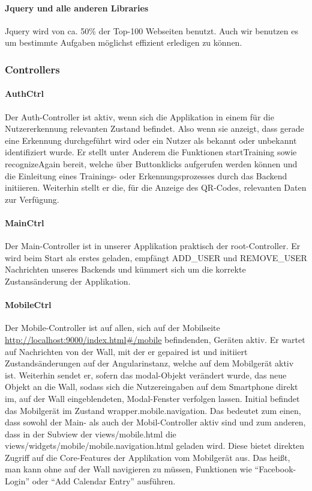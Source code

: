 \documentclass[10pt,a4paper]{report}
\newcommand{\code}[1]{{\fontfamily{cmvtt}\selectfont #1}}
\begin{document}
				\paragraph{Jquery und alle anderen Libraries}
					Jquery wird von ca. 50\% der Top-100 Webseiten benutzt. Auch wir benutzen es um bestimmte Aufgaben möglichst effizient erledigen zu können.
			\subsubsection{Controllers}
				\paragraph{AuthCtrl}
					Der Auth-Controller ist aktiv, wenn sich die Applikation in einem für die Nutzererkennung relevanten Zustand befindet. Also wenn sie anzeigt, dass gerade eine Erkennung durchgeführt wird oder ein Nutzer als bekannt oder unbekannt identifiziert wurde. Er stellt unter Anderem die Funktionen \code{startTraining} sowie \code{recognizeAgain} bereit, welche über Buttonklicks aufgerufen werden können und die Einleitung eines Trainings- oder Erkennungsprozesses durch das Backend initiieren. Weiterhin stellt er die, für die Anzeige des QR-Codes, relevanten Daten zur Verfügung.
				\paragraph{MainCtrl}
					Der Main-Controller ist in unserer Applikation praktisch der root-Controller. Er wird beim Start als erstes geladen, empfängt \code{ADD\_USER} und \code{REMOVE\_USER} Nachrichten unseres Backends und kümmert sich um die korrekte Zustansänderung der Applikation.
				\paragraph{MobileCtrl}
					Der Mobile-Controller ist auf allen, sich auf der Mobilseite \url{http://localhost:9000/index.html\#/mobile} befindenden, Geräten aktiv. Er wartet auf Nachrichten von der Wall, mit der er gepaired ist und initiiert Zustandsänderungen auf der Angularinstanz, welche auf dem Mobilgerät aktiv ist. Weiterhin sendet er, sofern das \code{modal}-Objekt verändert wurde, das neue Objekt an die Wall, sodass sich die Nutzereingaben auf dem Smartphone direkt im, auf der Wall eingeblendeten, Modal-Fenster verfolgen lassen. Initial befindet das Mobilgerät im Zustand \code{wrapper.mobile.navigation}. Das bedeutet zum einen, dass sowohl der Main- als auch der Mobil-Controller aktiv sind und zum anderen, dass in der Subview der \code{views/mobile.html} die \code{views/widgets/mobile/mobile.navigation.html} geladen wird. Diese bietet direkten Zugriff auf die Core-Features der Applikation vom Mobilgerät aus. Das heißt, man kann ohne auf der Wall navigieren zu müssen, Funktionen wie "`Facebook-Login"' oder "`Add Calendar Entry"' ausführen.
\end{document}
